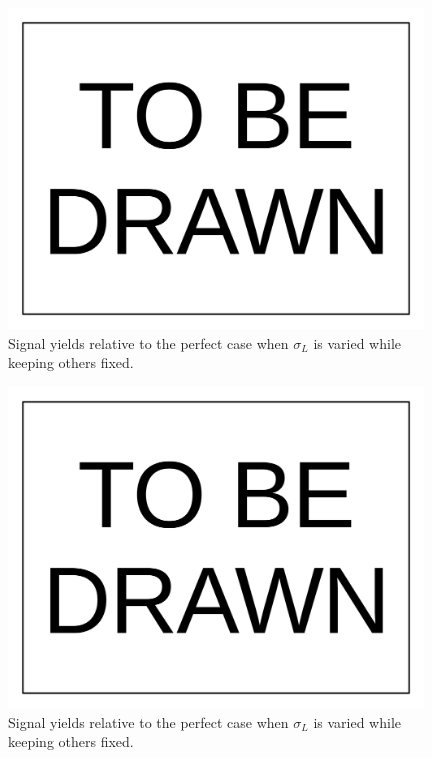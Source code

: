 \documentclass[10pt,a4paper,onecolumn]{article}
\begin{document}
\begin{figure}
\includegraphics[width=110mm]{ToBeDrawn.pdf}
\caption{Signal yields relative to the perfect case when $\sigma_L$ is varied while keeping others fixed.}
\label{Figure_RelativeYieldChangingSigmaLOnly}
\end{figure}

\begin{figure}
\includegraphics[width=110mm]{ToBeDrawn.pdf}
\caption{Signal yields relative to the perfect case when $\sigma_L$ is varied while keeping others fixed.}
\label{Figure_RelativeYieldChangingSigmaROnly}
\end{figure}
\end{document}
